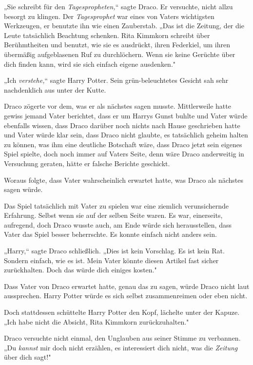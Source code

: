 {„Sie schreibt für den \emph{Tagespropheten,}“ sagte Draco. Er versuchte, nicht allzu besorgt zu klingen. Der \emph{Tagesprophet} war eines von Vaters wichtigsten Werkzeugen, er benutzte ihn wie einen Zauberstab. „Das ist die Zeitung, der die Leute tatsächlich Beachtung schenken. Rita Kimmkorn schreibt über Berühmtheiten und benutzt, wie sie es ausdrückt, ihren Federkiel, um ihren übermäßig aufgeblasenen Ruf zu durchlöchern. Wenn sie keine Gerüchte über dich finden kann, wird sie sich einfach eigene ausdenken."

„Ich \emph{verstehe,}“ sagte Harry Potter. Sein grün-beleuchtetes Gesicht sah sehr nachdenklich aus unter der Kutte.

Draco zögerte vor dem, was er als nächstes sagen musste. Mittlerweile hatte gewiss jemand Vater berichtet, dass er um Harrys Gunst buhlte und Vater würde ebenfalls wissen, dass Draco darüber noch nichts nach Hause geschrieben hatte und Vater würde klar sein, dass Draco nicht glaubte, es tatsächlich geheim halten zu können, was ihm eine deutliche Botschaft wäre, dass Draco jetzt sein eigenes Spiel spielte, doch noch immer auf Vaters Seite, denn wäre Draco anderweitig in Versuchung geraten, hätte er falsche Berichte geschickt.

Woraus folgte, dass Vater wahrscheinlich erwartet hatte, was Draco als nächstes sagen würde.

Das Spiel tatsächlich mit Vater zu spielen war eine ziemlich verunsichernde Erfahrung. Selbst wenn sie auf der selben Seite waren. Es war, einerseits, aufregend, doch Draco wusste auch, am Ende würde sich herausstellen, dass Vater das Spiel besser beherrschte. Es konnte einfach nicht anders sein.

„Harry,“ sagte Draco schließlich. „Dies ist kein Vorschlag. Es ist kein Rat. Sondern einfach, wie es ist. Mein Vater könnte diesen Artikel fast sicher zurückhalten. Doch das würde dich einiges kosten."

Dass Vater von Draco erwartet hatte, genau das zu sagen, würde Draco nicht laut aussprechen. Harry Potter würde es sich selbst zusammenreimen oder eben nicht.

Doch stattdessen schüttelte Harry Potter den Kopf, lächelte unter der Kapuze. „Ich habe nicht die Absicht, Rita Kimmkorn zurückzuhalten."

Draco versuchte nicht einmal, den Unglauben aus seiner Stimme zu verbannen. „Du \emph{kannst} mir doch nicht erzählen, es interessiert dich nicht, was die \emph{Zeitung} über dich sagt!"

}
